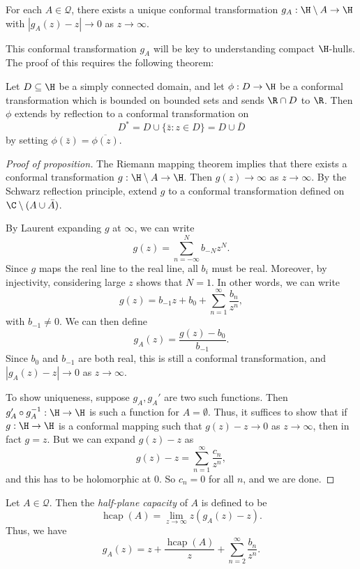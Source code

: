 \documentclass[a4paper]{article}
\DeclareMathOperator\hcap{hcap}
\begin{document}
\begin{prop}
  For each $A \in \mathcal{Q}$, there exists a unique conformal transformation $g_A: \H \setminus A \to \H$ with $|g_A(z) - z| \to 0$ as $z \to \infty$.
\end{prop}

This conformal transformation $g_A$ will be key to understanding compact $\H$-hulls. The proof of this requires the following theorem:
\begin{thm}
  Let $D \subseteq \H$ be a simply connected domain, and let $\phi: D \to \H$ be a conformal transformation which is bounded on bounded sets and sends $\R \cap D$ to $\R$. Then $\phi$ extends by reflection to a conformal transformation on
  \[
    D^* = D \cup \{\bar{z} : z \in D\} = D \cup \bar{D}
  \]
  by setting $\phi(\bar{z}) = \overline{\phi(z)}$.\fakeqed
\end{thm}

\begin{proof}[Proof of proposition]
  The Riemann mapping theorem implies that there exists a conformal transformation $g: \H \setminus A \to \H$. Then $g(z) \to \infty$ as $z \to \infty$. By the Schwarz reflection principle, extend $g$ to a conformal transformation defined on $\C \setminus (A \cup \bar{A})$.

  By Laurent expanding $g$ at $\infty$, we can write
  \[
    g(z) = \sum_{n = -\infty}^N b_{-N} z^N.
  \]
  Since $g$ maps the real line to the real line, all $b_i$ must be real. Moreover, by injectivity, considering large $z$ shows that $N = 1$. In other words, we can write
  \[
    g(z) = b_{-1} z + b_0 + \sum_{n = 1}^\infty \frac{b_n}{z^n},
  \]
  with $b_{-1} \not= 0$. We can then define
  \[
    g_A(z) = \frac{g(z) - b_0}{b_{-1}}.
  \]
  Since $b_0$ and $b_{-1}$ are both real, this is still a conformal transformation, and $|g_A(z) - z| \to 0$ as $z \to \infty$.

  To show uniqueness, suppose $g_A, g_A'$ are two such functions. Then $g_A' \circ g_A^{-1}: \H \to \H$ is such a function for $A = \emptyset$. Thus, it suffices to show that if $g: \H \to \H$ is a conformal mapping such that $g(z) - z \to 0$ as $z \to \infty$, then in fact $g = z$. But we can expand $g(z) - z$ as
  \[
    g(z) - z = \sum_{n = 1}^\infty \frac{c_n}{z^n},
  \]
  and this has to be holomorphic at $0$. So $c_n = 0$ for all $n$, and we are done.
\end{proof}

\begin{defi}
  Let $A \in \mathcal{Q}$. Then the \emph{half-plane capacity} of $A$ is defined to be
  \[
    \hcap(A) = \lim_{z \to \infty} z(g_A(z) - z).
  \]
  Thus, we have
  \[
    g_A(z) = z + \frac{\hcap(A)}{z} + \sum_{n = 2}^\infty \frac{b_n}{z^n}.
  \]
\end{defi}
\end{document}
